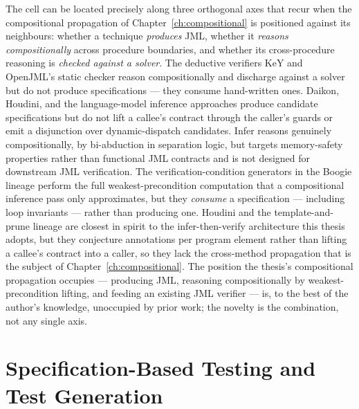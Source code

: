 The cell can be located precisely along three orthogonal axes that recur when the
compositional propagation of Chapter~\ref{ch:compositional} is positioned against
its neighbours: whether a technique \emph{produces} JML, whether it \emph{reasons
compositionally} across procedure boundaries, and whether its cross-procedure
reasoning is \emph{checked against a solver}. The deductive verifiers KeY and
OpenJML's static checker reason compositionally and discharge against a solver but
do not produce specifications --- they consume hand-written ones. Daikon,
Houdini, and the language-model inference approaches produce candidate
specifications but do not lift a callee's contract through the caller's guards or
emit a disjunction over dynamic-dispatch candidates. Infer reasons genuinely
compositionally, by bi-abduction in separation logic, but targets memory-safety
properties rather than functional JML contracts and is not designed for downstream
JML verification. The verification-condition generators in the Boogie lineage
perform the full weakest-precondition computation that a compositional inference
pass only approximates, but they \emph{consume} a specification --- including loop
invariants --- rather than producing one. Houdini and the template-and-prune
lineage are closest in spirit to the infer-then-verify architecture this thesis
adopts, but they conjecture annotations per program element rather than lifting a
callee's contract into a caller, so they lack the cross-method propagation that is
the subject of Chapter~\ref{ch:compositional}. The position the thesis's
compositional propagation occupies --- producing JML, reasoning compositionally by
weakest-precondition lifting, and feeding an existing JML verifier --- is, to the
best of the author's knowledge, unoccupied by prior work; the novelty is the
combination, not any single axis.

\section{Specification-Based Testing and Test Generation}
\label{sec:bg-sbt}

